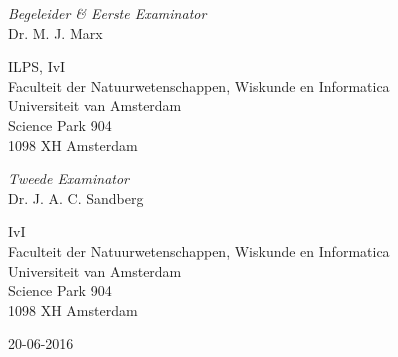 \begin{center}
\begin{figure}[H]
\end{figure}


\vspace{1cm}

\emph{Begeleider \& Eerste Examinator}\\
Dr. M. J. Marx

\vspace{0.25cm}

ILPS, IvI\\
Faculteit der Natuurwetenschappen, Wiskunde en Informatica\\
Universiteit van Amsterdam\\
Science Park 904\\
1098 XH  Amsterdam

\vspace{1cm}

\emph{Tweede Examinator}\\
Dr. J. A. C. Sandberg

\vspace{0.25cm}
IvI\\
Faculteit der Natuurwetenschappen, Wiskunde en Informatica\\
Universiteit van Amsterdam\\
Science Park 904\\
1098 XH  Amsterdam
\vspace{1cm}

20-06-2016
\thispagestyle{empty}

\end{center}
